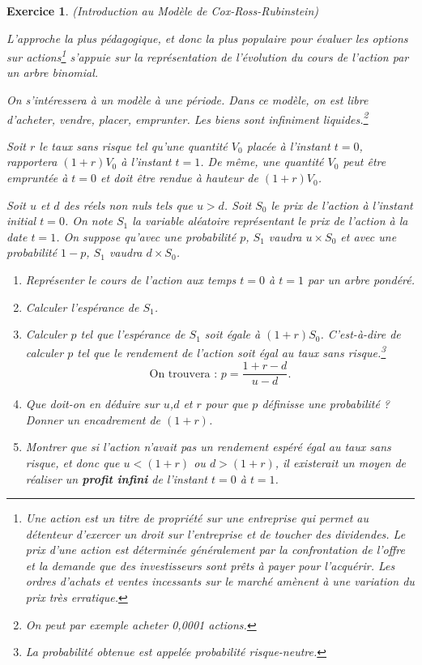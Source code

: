 \documentclass[10pt]{article}
\theoremstyle{exostyle}
\newtheorem{exercice}{Exercice}
\begin{document}
\begin{exercice}
    (Introduction au Modèle de Cox-Ross-Rubinstein)
    \par L'approche la plus pédagogique, et donc la plus populaire pour évaluer les options sur actions\footnote{Une action est un titre de propriété sur une entreprise qui permet au détenteur d'exercer un droit sur l'entreprise et de toucher des dividendes. Le prix d'une action est déterminée généralement par la confrontation de l'offre et la demande que des investisseurs sont prêts à payer pour l'acquérir. Les ordres d'achats et ventes incessants sur le marché amènent à une variation du prix très erratique.} s'appuie sur la représentation de l'évolution du cours de l'action par un arbre binomial.
    \par On s'intéressera à un modèle à une période. Dans ce modèle, on est libre d'acheter, vendre, placer, emprunter. Les biens sont infiniment liquides.\footnote{On peut par exemple acheter 0,0001 actions.}
    \par Soit $r$ le taux sans risque tel qu'une quantité $V_0$ placée à l'instant $t=0$, rapportera $(1+r)V_0$ à l'instant $t=1$. De même, une quantité $V_0$ peut être empruntée à $t=0$ et doit être rendue à hauteur de $(1+r)V_0$.
    \par Soit $u$ et $d$ des réels non nuls tels que $u>d$. Soit $S_0$ le prix de l'action à l'instant initial $t=0$. On note $S_1$ la variable aléatoire représentant le prix de l'action à la date $t=1$. On suppose qu'avec une probabilité $p$, $S_1$ vaudra $u\times S_0$ et avec une probabilité $1-p$, $S_1$ vaudra $d\times S_0$.
    \begin{enumerate}
        \item Représenter le cours de l'action aux temps $t=0$ à $t=1$ par un arbre pondéré.
        \item Calculer l'espérance de $S_1$.
        \item Calculer $p$ tel que l'espérance de $S_1$ soit égale à $(1+r)S_0$. C'est-à-dire de calculer $p$ tel que le rendement de l'action soit égal au taux sans risque.\footnote{La probabilité obtenue est appelée probabilité risque-neutre.}
              \[
                  \text{On trouvera :   }  p= \dfrac{1+r-d}{u-d}.
              \]
        \item Que doit-on en déduire sur $u$,$d$ et $r$ pour que $p$ définisse une probabilité ? Donner un encadrement de $(1+r)$.
        \item Montrer que si l'action n'avait pas un rendement espéré égal au taux sans risque, et donc que $u<(1+r)$ ou $d>(1+r)$, il existerait un moyen de réaliser un \textbf{profit infini} de l'instant $t=0$ à $t=1$.

\end{enumerate}
\end{exercice}
\end{document}
